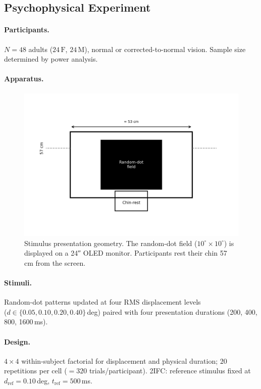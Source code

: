 \documentclass[preprint,11pt]{elsarticle}
\begin{document}
\subsection{Psychophysical Experiment}

\paragraph{Participants.}
$N=48$ adults ($24\,\mathrm{F}$, $24\,\mathrm{M}$), normal or
corrected-to-normal vision.  Sample size determined by power analysis.

\paragraph{Apparatus.}
\begin{figure}[ht]
  \centering
  \includegraphics[width=.7\linewidth]{figures/apparatus_diagram.png}
  \caption{Stimulus presentation geometry. The random-dot field
           (\(10^\circ \times 10^\circ\)) is displayed on a 24″ OLED monitor.
           Participants rest their chin 57 cm from the screen.}
  \label{fig:apparatus}
\end{figure}

\paragraph{Stimuli.}
Random-dot patterns updated at four RMS displacement levels \\
($d \in \{0.05,\allowbreak 0.10,\allowbreak 0.20,\allowbreak 0.40\}$\,deg) paired with four presentation durations (200, 400, 800, 1600\,ms).

\paragraph{Design.}
$4\times4$ within-subject factorial for displacement and physical
duration; $20$ repetitions per cell ($=320$ trials\slash participant).
2IFC: reference stimulus fixed at $d_{\mathrm{ref}}=0.10$\,deg,
$t_{\mathrm{ref}}=500$\,ms.
\end{document}
